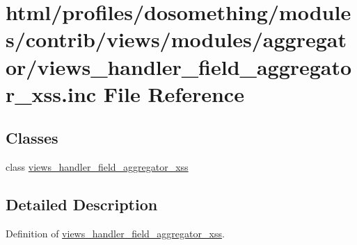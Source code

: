 \hypertarget{views__handler__field__aggregator__xss_8inc}{
\section{html/profiles/dosomething/modules/contrib/views/modules/aggregator/views\_\-handler\_\-field\_\-aggregator\_\-xss.inc File Reference}
\label{views__handler__field__aggregator__xss_8inc}
}
\subsection*{Classes}
\begin{DoxyCompactItemize}
\item 
class \hyperlink{classviews__handler__field__aggregator__xss}{views\_\-handler\_\-field\_\-aggregator\_\-xss}
\end{DoxyCompactItemize}


\subsection{Detailed Description}
Definition of \hyperlink{classviews__handler__field__aggregator__xss}{views\_\-handler\_\-field\_\-aggregator\_\-xss}. 